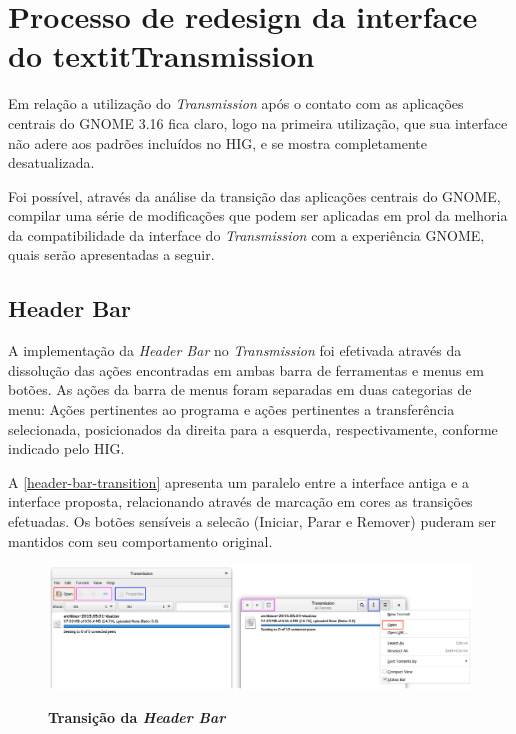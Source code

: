 \section{Processo de redesign da interface do textit{Transmission}}

Em relação a utilização do \textit{Transmission} após o contato com as
aplicações centrais do GNOME 3.16 fica claro, logo na primeira utilização, que
sua interface não adere aos padrões incluídos no HIG, e se mostra completamente
desatualizada.

Foi possível, através da análise da transição das aplicações centrais do GNOME,
compilar uma série de modificações que podem ser aplicadas em prol da melhoria
da compatibilidade da interface do \textit{Transmission} com a experiência
GNOME, quais serão apresentadas a seguir.

\subsection{Header Bar}

A implementação da \textit{Header Bar} no \textit{Transmission} foi efetivada
através da dissolução das ações encontradas em ambas barra de ferramentas e
menus em botões. As ações da barra de menus foram separadas em duas categorias
de menu: Ações pertinentes ao programa e ações pertinentes a transferência
selecionada, posicionados da direita para a esquerda, respectivamente, conforme
indicado pelo HIG.

A \autoref{header-bar-transition} apresenta um paralelo entre a interface antiga
e a interface proposta, relacionando através de marcação em cores as transições
efetuadas. Os botões sensíveis a selecão (Iniciar, Parar e Remover) puderam ser
mantidos com seu comportamento original.

\begin{figure}[!ht]
  \begin{center}
    \caption{\textbf{Transição da \textit{Header Bar}}}
    \includegraphics [width=\textwidth]{image/header-bar-transition.eps}
    \label{header-bar-transition}
  \end{center}
\end{figure}


